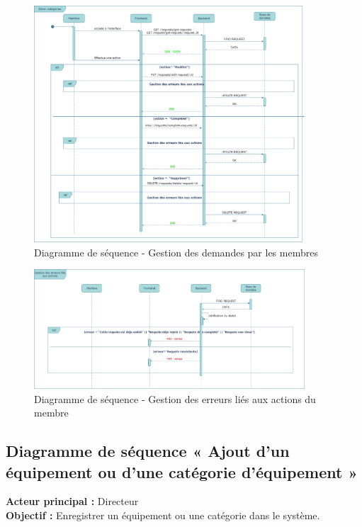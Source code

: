 \begin{figure}[ht]
    \centering
    \includegraphics[width=0.9\textwidth]{images/diagramme_de_sequence/gestion_des_demandes_membre.drawio.png}
    \caption{Diagramme de  séquence - Gestion des demandes par les membres}
    \label{fig:demande_diagram}
\end{figure}
\begin{figure}[ht]
    \centering
    \includegraphics[width=0.9\textwidth]{images/diagramme_de_sequence/gestion_erreurs_demandes_membres.png}
    \caption{Diagramme de  séquence - Gestion des erreurs liés aux actions du membre}
    \label{fig:error_diagram}
\end{figure}


\subsection{Diagramme de séquence « Ajout d'un équipement ou d'une catégorie d'équipement »}

\textbf{Acteur principal :} Directeur \\
\textbf{Objectif :} Enregistrer un équipement ou une catégorie dans le système.

